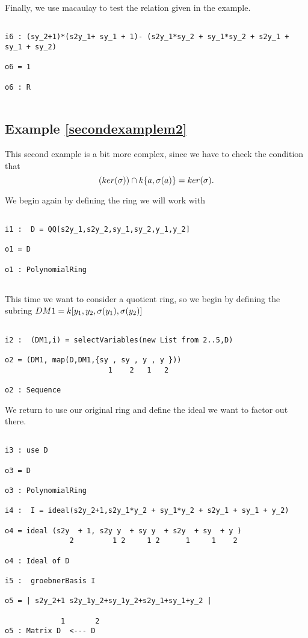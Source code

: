 Finally, we use macaulay to test the relation given in the example.

\begin{lstlisting}

i6 : (sy_2+1)*(s2y_1+ sy_1 + 1)- (s2y_1*sy_2 + sy_1*sy_2 + s2y_1 + sy_1 + sy_2)

o6 = 1

o6 : R


\end{lstlisting}

\subsection{Example \ref{secondexamplem2}}

This second example is a bit more complex, since we have to check the condition that
$$(ker(\sigma)) \cap k\{a,\sigma(a)\} = ker(\sigma).$$

We begin again by defining the ring we will work with

\begin{lstlisting}

i1 :  D = QQ[s2y_1,s2y_2,sy_1,sy_2,y_1,y_2]

o1 = D

o1 : PolynomialRing


\end{lstlisting}

This time we want to consider a quotient ring, so we begin by defining the subring $DM1 = k[y_1,y_2,\sigma(y_1),\sigma(y_2)]$

\begin{lstlisting}

i2 :  (DM1,i) = selectVariables(new List from 2..5,D)

o2 = (DM1, map(D,DM1,{sy , sy , y , y }))
                        1    2   1   2

o2 : Sequence

\end{lstlisting}

We return to use our original ring and define the ideal we want to factor out there.

\begin{lstlisting}

i3 : use D

o3 = D

o3 : PolynomialRing

i4 :  I = ideal(s2y_2+1,s2y_1*y_2 + sy_1*y_2 + s2y_1 + sy_1 + y_2)

o4 = ideal (s2y  + 1, s2y y  + sy y  + s2y  + sy  + y )
               2         1 2     1 2      1     1    2

o4 : Ideal of D

i5 :  groebnerBasis I

o5 = | s2y_2+1 s2y_1y_2+sy_1y_2+s2y_1+sy_1+y_2 |

             1       2
o5 : Matrix D  <--- D


\end{lstlisting}

